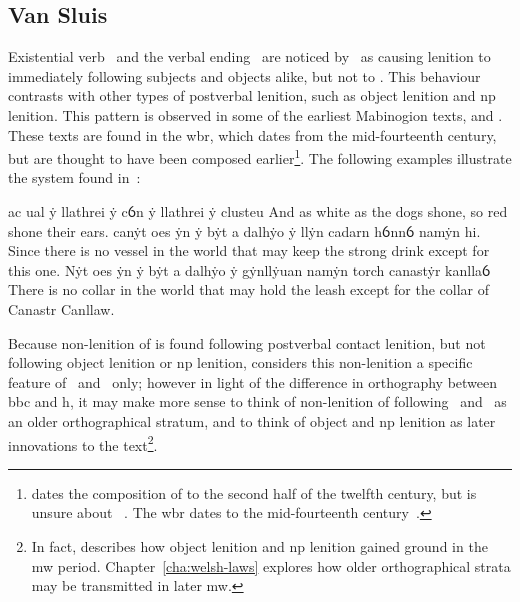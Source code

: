 \subsection{Van Sluis}
\label{sec:van-sluis}
Existential verb \oes\ and the verbal ending \ei\ are noticed by~\textcite{van_development14} as causing lenition to immediately following subjects and objects alike, but not to . This behaviour contrasts with other types of postverbal lenition, such as object lenition and \gls{np} lenition. This pattern is observed in some of the earliest Mabinogion texts, \ie {} and . These texts are found in the \gls{wbr}, which dates from the mid-fourteenth century, but are thought to have been composed earlier\footnote{\Textcite[43]{rodway_date_2005} dates the composition of  to the second half of the twelfth century, but is unsure about ~\autocite[59]{Rod_Where07}. The \gls{wbr} dates to the mid-fourteenth century~\autocite[59]{huws_medieval_2000}.}. The following examples  illustrate the system found in~\textcite{van_development14}:
\begin{mwl}
  {ac ual ẏ llathrei  ẏ cỽn ẏ llathrei  ẏ clusteu}%
  {And as white as the dogs shone, so red shone their ears.}%
  {canẏt oes  ẏn ẏ bẏt a dalhẏo ẏ llẏn cadarn hỽnnỽ namẏn hi.}%
  {Since there is no vessel in the world that may keep the strong drink except for this one.}%
  {Nẏt oes  ẏn ẏ bẏt a dalhẏo ẏ gẏnllẏuan namẏn torch canastẏr kanllaỽ}%
  {There is no collar in the world that may hold the leash except for the collar of Canastr Canllaw.}%
\end{mwl}
Because non-lenition of  is found following postverbal contact lenition, but not following object lenition or \gls{np} lenition, \textcite{van_development14} considers this non-lenition a specific feature of \ei\ and \oes\ only; however in light of the difference in orthography between \gls{bbc} and \gls{h}, it may make more sense to think of non-lenition of  following \ei\ and \oes\ as an older orthographical stratum, and to think of object and \gls{np} lenition as later innovations to the text\footnote{In fact, \textcite{van_development14} describes how object lenition and \gls{np} lenition gained ground in the \gls{mw} period. Chapter~\ref{cha:welsh-laws} explores how older orthographical strata may be transmitted in later \gls{mw}.}.


